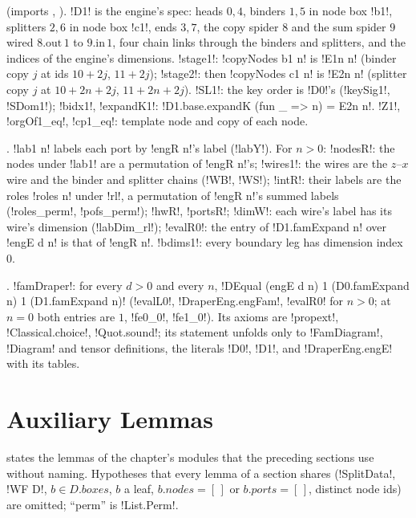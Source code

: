 { (imports , ). \lbx!D1! is the engine's spec: heads $0,4$, binders $1,5$ in node box \lbx!b1!, splitters $2,6$ in node box \lbx!c1!, ends $3,7$, the copy spider $8$ and the sum spider $9$ wired $8.\mathrm{out}\,1$ to $9.\mathrm{in}\,1$, four chain links through the binders and splitters, and the indices of the engine's dimensions. \lbx!stage1!: \lbx!copyNodes b1 n! is \lbx!E1n n! (binder copy $j$ at ids $10+2j$, $11+2j$); \lbx!stage2!: then \lbx!copyNodes c1 n! is \lbx!E2n n! (splitter copy $j$ at $10+2n+2j$, $11+2n+2j$). \lbx!SL1!: the key order is \lbx!D0!'s (\lbx!keySig1!, \lbx!SDom1!); \lbx!bidx1!, \lbx!expandK1!: \lbx!D1.base.expandK (fun _ => n) = E2n n!. \lbx!Z1!, \lbx!orgOf1_eq!, \lbx!cp1_eq!: template node and copy of each node.

. \lbx!lab1 n! labels each port by \lbx!engR n!'s label (\lbx!labY!). For $n>0$: \lbx!nodesR!: the nodes under \lbx!lab1! are a permutation of \lbx!engR n!'s; \lbx!wires1!: the wires are the $z$--$x$ wire and the binder and splitter chains (\lbx!WB!, \lbx!WS!); \lbx!intR!: their labels are the roles \lbx!roles n! under \lbx!rl!, a permutation of \lbx!engR n!'s summed labels (\lbx!roles_perm!, \lbx!pofs_perm!); \lbx!hwR!, \lbx!portsR!; \lbx!dimW!: each wire's label has its wire's dimension (\lbx!labDim_rl!); \lbx!evalR0!: the entry of \lbx!D1.famExpand n! over \lbx!engE d n! is that of \lbx!engR n!. \lbx!bdims1!: every boundary leg has dimension index $0$.

. \lbx!famDraper!: for every $d>0$ and every $n$, \lbx!DEqual (engE d n) 1 (D0.famExpand n) 1 (D1.famExpand n)! (\lbx!evalL0!, \lbx!DraperEng.engFam!, \lbx!evalR0! for $n>0$; at $n=0$ both entries are $1$, \lbx!fe0_0!, \lbx!fe1_0!). Its axioms are \lean!propext!, \lean!Classical.choice!, \lean!Quot.sound!; its statement unfolds only to \lbx!FamDiagram!, \lbx!Diagram! and tensor definitions, the literals \lbx!D0!, \lbx!D1!, and \lbx!DraperEng.engE! with its tables.

\section{Auxiliary Lemmas}\label{sec:boxes-aux}

 states the lemmas of the chapter's modules that the preceding sections use without naming. Hypotheses that every lemma of a section shares (\lbx!SplitData!, \lbx!WF D!, $b\in D.\mathit{boxes}$, $b$ a leaf, $b.\mathit{nodes}=[\,]$ or $b.\mathit{ports}=[\,]$, distinct node ids) are omitted; ``perm'' is \lbx!List.Perm!.

}
